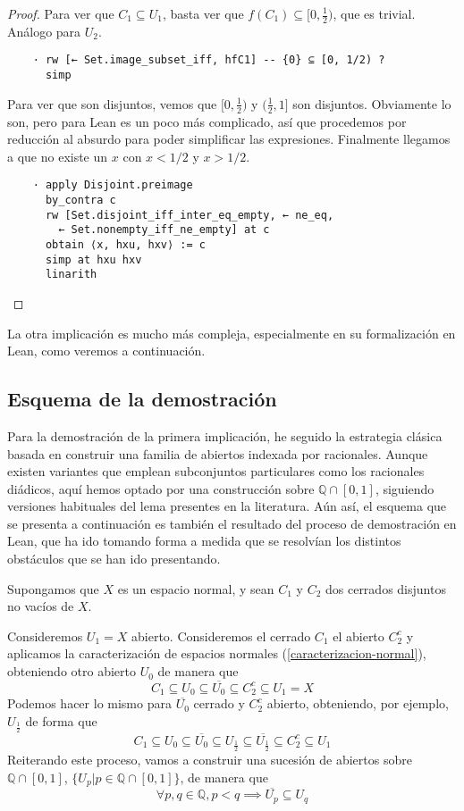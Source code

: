 \begin{proof}
  Para ver que $C_1 \subseteq U_1$, basta ver que $f(C_1) \subseteq [0, \frac{1}{2})$, que es trivial. Análogo para $U_2$.

  \begin{lstlisting}
    · rw [← Set.image_subset_iff, hfC1] -- {0} ⊆ [0, 1/2) ?
      simp \end{lstlisting}

  Para ver que son disjuntos, vemos que $[0, \frac{1}{2})$ y $(\frac{1}{2}, 1]$ son disjuntos. Obviamente lo son, pero para Lean es un poco más complicado, así que procedemos por reducción al absurdo para poder simplificar las expresiones. Finalmente llegamos a que no existe un $x$ con $x < 1/2$ y $x > 1/2$.

  \begin{lstlisting}
    · apply Disjoint.preimage
      by_contra c
      rw [Set.disjoint_iff_inter_eq_empty, ← ne_eq,
        ← Set.nonempty_iff_ne_empty] at c
      obtain ⟨x, hxu, hxv⟩ := c
      simp at hxu hxv
      linarith \end{lstlisting}
\end{proof}


La otra implicación es mucho más compleja, especialmente en su formalización en Lean, como veremos a continuación.


\subsection{Esquema de la demostración}

Para la demostración de la primera implicación, he seguido la estrategia clásica basada en construir una familia de abiertos indexada por racionales. Aunque existen variantes que emplean subconjuntos particulares como los racionales diádicos, aquí hemos optado por una construcción sobre $\mathbb{Q} \cap [0,1]$, siguiendo versiones habituales del lema presentes en la literatura. Aún así, el esquema que se presenta a continuación es también el resultado del proceso de demostración en Lean, que ha ido tomando forma a medida que se resolvían los distintos obstáculos que se han ido presentando.

Supongamos que $X$ es un espacio normal, y sean $C_1$ y $C_2$ dos cerrados disjuntos no vacíos de $X$.

Consideremos $U_1 = X$ abierto. Consideremos el cerrado $C_1$ el abierto $C_2^c$ y aplicamos la caracterización de espacios normales (\ref{caracterizacion-normal}), obteniendo otro abierto $U_0$ de manera que
$$
C_1 \subseteq U_0 \subseteq \overline{U_0} \subseteq C_2^c \subseteq U_1 = X
$$
Podemos hacer lo mismo para $\overline{U_0}$ cerrado y $C_2^c$ abierto, obteniendo, por ejemplo, $U_{\frac{1}{2}}$ de forma que
$$
C_1 \subseteq U_0 \subseteq \overline{U_0} \subseteq U_{\frac{1}{2}} \subseteq \overline{U_{\frac{1}{2}}} \subseteq C_2^c \subseteq U_1
$$
Reiterando este proceso, vamos a construir una sucesión de abiertos sobre $\mathbb{Q}\cap[0, 1]$, $\{U_p | p \in \mathbb{Q}\cap[0, 1]\}$, de manera que
\begin{equation}
  \forall p , q \in \mathbb{Q}, p < q \implies \overline{U_p} \subseteq U_q \tag{$\star$} \label{eq:star}
\end{equation}

